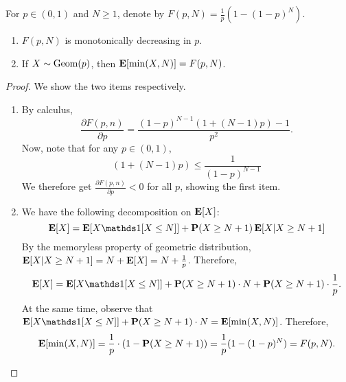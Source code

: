\begin{lemma}
For $p \in (0,1)$ and $N \geq 1$, denote by $F(p, N) = \frac{1}{p}(1 - (1-p)^N)$.
\begin{enumerate}
  \item $F(p, N)$ is monotonically decreasing in $p$.
  \item If $X \sim \operatorname*{Geom}(p)$, then $\operatorname*{\mathbf{E}}[\min(X, N)] = F(p, N)$.
\end{enumerate}
\label{lem:truncated-geom}
\end{lemma}
\begin{proof}
We show the two items respectively.
\begin{enumerate}
\item By calculus,
\[ \frac{\partial F(p,n)}{\partial p} = \frac{(1-p)^{N-1} (1 + (N-1)p) - 1}{p^2}. \]
Now, note that for any $p \in (0,1)$,
\[ (1 + (N-1)p) \leq \frac{1}{(1 - p)^{N-1}} \]
We therefore get $\frac{\partial F(p,n)}{\partial p} < 0$ for all $p$, showing the first item.

\item We have the following decomposition on $\operatorname*{\mathbf{E}}[X]$:
\[ \Exp[X] = \Exp[X \one[X \leq N]] + \Prob(X \geq N+1) \Exp[X|X \geq N+1] \]
By the memoryless property of geometric distribution, $\operatorname*{\mathbf{E}}[X|X \geq N+1] = N + \operatorname*{\mathbf{E}}[X] = N + \frac 1 p$.
Therefore,
\[ \Exp[X] = \Exp[X \one[X \leq N]] + \Prob(X \geq N+1) \cdot N + \Prob(X \geq N+1) \cdot \frac 1 p. \]
At the same time, observe that $\Exp[X \one[X \leq N]] + \Prob(X \geq N+1) \cdot N = \Exp[\min(X, N)]$.
Therefore,
\[ \operatorname*{\mathbf{E}}[\min(X, N)] = \frac 1 p \cdot (1 - \operatorname*{\mathbf{P}}(X \geq N+1)) = \frac{1}{p}(1 - (1-p)^N) = F(p, N). \qedhere \]
\end{enumerate}
\end{proof}
